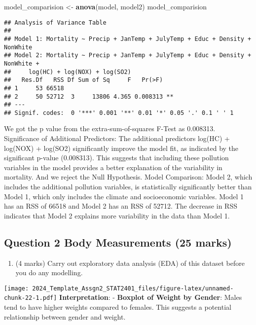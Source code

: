 \documentclass[
]{article}
\newenvironment{Shaded}{\begin{snugshade}}{\end{snugshade}}
\newcommand{\FunctionTok}[1]{\textcolor[rgb]{0.13,0.29,0.53}{\textbf{#1}}}
\newcommand{\NormalTok}[1]{#1}
\newcommand{\OtherTok}[1]{\textcolor[rgb]{0.56,0.35,0.01}{#1}}
\providecommand{\tightlist}{%
  \setlength{\itemsep}{0pt}\setlength{\parskip}{0pt}}
\begin{document}
\begin{Shaded}
\begin{Highlighting}[]
\NormalTok{model\_comparision }\OtherTok{\textless{}{-}} \FunctionTok{anova}\NormalTok{(model, model2)}
\NormalTok{model\_comparision}
\end{Highlighting}
\end{Shaded}

\begin{verbatim}
## Analysis of Variance Table
## 
## Model 1: Mortality ~ Precip + JanTemp + JulyTemp + Educ + Density + NonWhite
## Model 2: Mortality ~ Precip + JanTemp + JulyTemp + Educ + Density + NonWhite + 
##     log(HC) + log(NOX) + log(SO2)
##   Res.Df   RSS Df Sum of Sq     F   Pr(>F)   
## 1     53 66518                               
## 2     50 52712  3     13806 4.365 0.008313 **
## ---
## Signif. codes:  0 '***' 0.001 '**' 0.01 '*' 0.05 '.' 0.1 ' ' 1
\end{verbatim}

We got the p value from the extra-sum-of-squares F-Test as 0.008313.
Significance of Additional Predictors: The additional predictors log(HC)
+ log(NOX) + log(SO2) significantly improve the model fit, as indicated
by the significant p-value (0.008313). This suggests that including
these pollution variables in the model provides a better explanation of
the variability in mortality. And we reject the Null Hypothesis. Model
Comparison: Model 2, which includes the additional pollution variables,
is statistically significantly better than Model 1, which only includes
the climate and socioeconomic variables. Model 1 has an RSS of 66518 and
Model 2 has an RSS of 52712. The decrease in RSS indicates that Model 2
explains more variability in the data than Model 1.

\hypertarget{question-2-body-measurements-25-marks}{%
\subsection{Question 2 Body Measurements (25
marks)}\label{question-2-body-measurements-25-marks}}

\begin{enumerate}
\def\labelenumi{(\alph{enumi})}
\tightlist
\item
  (4 marks) Carry out exploratory data analysis (EDA) of this dataset
  before you do any modelling.
\end{enumerate}

\texttt{[image: 2024\_Template\_Assgn2\_STAT2401\_files/figure-latex/unnamed-chunk-22-1.pdf]}
\textbf{Interpretation}: - \textbf{Boxplot of Weight by Gender}: Males
tend to have higher weights compared to females. This suggests a
potential relationship between gender and weight.
\end{document}
